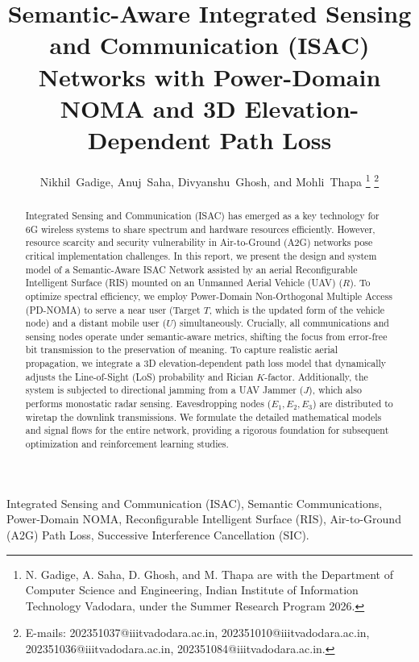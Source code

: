 \documentclass[journal,onecolumn]{IEEEtran}
\begin{document}
\title{Semantic-Aware Integrated Sensing and Communication (ISAC) Networks with Power-Domain NOMA and 3D Elevation-Dependent Path Loss}

\author{
Nikhil~Gadige,
Anuj~Saha,
Divyanshu~Ghosh,
and Mohli~Thapa%
\thanks{N. Gadige, A. Saha, D. Ghosh, and M. Thapa are with the Department of Computer Science and Engineering, Indian Institute of Information Technology Vadodara, under the Summer Research Program 2026.}%
\thanks{E-mails: 202351037@iiitvadodara.ac.in, 202351010@iiitvadodara.ac.in, 202351036@iiitvadodara.ac.in, 202351084@iiitvadodara.ac.in.}
}

\maketitle

\begin{abstract}
Integrated Sensing and Communication (ISAC) has emerged as a key technology for 6G wireless systems to share spectrum and hardware resources efficiently. However, resource scarcity and security vulnerability in Air-to-Ground (A2G) networks pose critical implementation challenges. In this report, we present the design and system model of a Semantic-Aware ISAC Network assisted by an aerial Reconfigurable Intelligent Surface (RIS) mounted on an Unmanned Aerial Vehicle (UAV) ($R$). To optimize spectral efficiency, we employ Power-Domain Non-Orthogonal Multiple Access (PD-NOMA) to serve a near user (Target $T$, which is the updated form of the vehicle node) and a distant mobile user ($U$) simultaneously. Crucially, all communications and sensing nodes operate under semantic-aware metrics, shifting the focus from error-free bit transmission to the preservation of meaning. To capture realistic aerial propagation, we integrate a 3D elevation-dependent path loss model that dynamically adjusts the Line-of-Sight (LoS) probability and Rician $K$-factor. Additionally, the system is subjected to directional jamming from a UAV Jammer ($J$), which also performs monostatic radar sensing. Eavesdropping nodes ($E_1, E_2, E_3$) are distributed to wiretap the downlink transmissions. We formulate the detailed mathematical models and signal flows for the entire network, providing a rigorous foundation for subsequent optimization and reinforcement learning studies.
\end{abstract}

\begin{IEEEkeywords}
Integrated Sensing and Communication (ISAC), Semantic Communications, Power-Domain NOMA, Reconfigurable Intelligent Surface (RIS), Air-to-Ground (A2G) Path Loss, Successive Interference Cancellation (SIC).
\end{IEEEkeywords}
\end{document}
